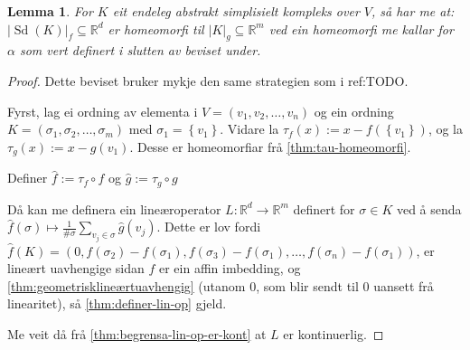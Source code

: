 \documentclass[a4paper, titlepage, 12pt, norsk]{article}
\theoremstyle{plain}
\newtheorem{lemma}[theorem]{Lemma}
\theoremstyle{definition}
\newcommand{\Rb}{\mathbb{R}}
\newcommand{\gr}[1]{ \lvert #1 \rvert } %
\newcommand{\set}[1]{ \left \{ #1 \right \} } %
\DeclareMathOperator{\Sd}{Sd}
\begin{document}
\begin{lemma}
	For \( K \) eit endeleg abstrakt simplisielt kompleks over \( V \), så har me at:
	\( \gr{\Sd(K)}_f \subseteq \Rb^d \) er homeomorfi til \( \gr{K}_g \subseteq \Rb^m \) ved ein homeomorfi me kallar for \( \alpha \) som vert definert i slutten av beviset under.
\end{lemma}

\begin{proof} %
	Dette beviset bruker mykje den same strategien som i ref:TODO.

	Fyrst, lag ei ordning av elementa i \( V = (v_1, v_2, \dots, v_n) \) og ein ordning \( K = (\sigma_1, \sigma_2, \dots, \sigma_m) \) med \( \sigma_1 = \set{v_1} \). Vidare la \( \tau_f(x) := x-f(\set{v_1}) \), og la \( \tau_g(x) := x-g(v_1) \). Desse er homeomorfiar frå \autoref{thm:tau-homeomorfi}.

	Definer \( \hat{f} := \tau_f \circ f \) og \( \hat{g} := \tau_g \circ g \)

	Då kan me definera ein lineæroperator \( L: \Rb^d \to \Rb^m \) definert for \( \sigma \in K \) ved å senda \( \hat{f}(\sigma) \mapsto \frac{1}{\#\sigma}\sum_{v_j \in \sigma} \hat{g}(v_j) \). Dette er lov fordi \( \hat{f}(K) = (0, f(\sigma_2)-f(\sigma_1), f(\sigma_3)-f(\sigma_1), \dots, f(\sigma_n)-f(\sigma_1) ) \), er lineært uavhengige sidan \( f \) er ein affin imbedding, og \autoref{thm:geometrisklineærtuavhengig} (utanom \( 0 \), som blir sendt til \( 0 \) uansett frå linearitet), så \autoref{thm:definer-lin-op} gjeld.

	Me veit då frå \autoref{thm:begrensa-lin-op-er-kont} at \( L \) er kontinuerlig. 


\end{proof}
\end{document}
